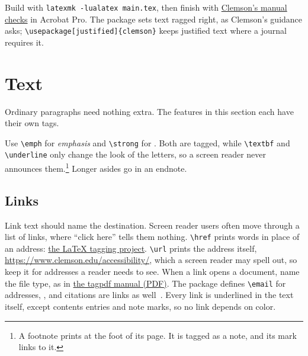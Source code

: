 \documentclass[12pt]{article}
\begin{document}
Build with \verb|latexmk -lualatex main.tex|, then finish with
\href{https://www.clemson.edu/accessibility/digital/guides/pdf/check-accessibility/manual-checks.html}{Clemson's
manual checks} in Acrobat Pro. The package sets text ragged right, as Clemson's
guidance asks; \verb|\usepackage[justified]{clemson}| keeps justified text
where a journal requires it.

\section{Text}
\label{sec:text}
Ordinary paragraphs need nothing extra. The features in this section each have
their own tags.

Use \verb|\emph| for \emph{emphasis} and \verb|\strong| for . Both are tagged, while \verb|\textbf| and \verb|\underline| only change
the look of the letters, so a screen reader never announces them.\footnote{A
footnote prints at the foot of its page. It is tagged as a note, and its mark
links to it.} Longer asides go in an endnote.
\subsection{Links}
Link text should name the destination. Screen reader users often move through a
list of links, where ``click here'' tells them nothing. \verb|\href| prints
words in place of an address:
\href{https://latex3.github.io/tagging-project/}{the LaTeX tagging project}.
\verb|\url| prints the address itself, \url{https://www.clemson.edu/accessibility/},
which a screen reader may spell out, so keep it for addresses a reader needs to
see. When a link opens a document, name the file type, as in
\href{https://mirrors.ctan.org/macros/latex/contrib/tagpdf/tagpdf.pdf}{the
tagpdf manual (PDF)}. The package defines \verb|\email| for addresses,
, and citations are links as
well~\cite{knuth1984,lamport1994}. Every link is underlined in the text itself,
except contents entries and note marks, so no link depends on color.
\end{document}
